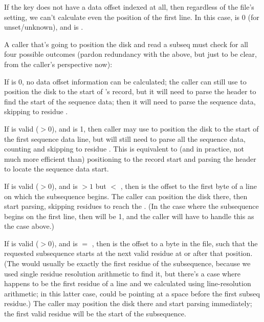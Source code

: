 \begin{sreapi}
If the key does not have a data offset indexed at all,
then regardless of the file's 
setting, we can't calculate even the position of the
first line. In this case,  is 0 (for
unset/unknown), and  is .

A caller that's going to position the disk and read a
subseq must check for all four possible outcomes (pardon
redundancy with the above, but just to be clear, from the
caller's perspective now):

If  is 0, no data offset information can be
calculated; the caller can still use  to
position the disk to the start of 's record, but it
will need to parse the header to find the start of the
sequence data; then it will need to parse the sequence
data, skipping to residue .

If  is valid ($>0$), and  is
1, then caller may use  to position the disk to
the start of the first sequence data line, but will still
need to parse all the sequence data, counting and
skipping to residue . This is equivalent
to (and in practice, not much more efficient than)
positioning to the record start and parsing the header to
locate the sequence data start. 

If  is valid ($>0$), and  is
$>1$ but $<$ , then  is the
offset to the first byte of a line on which the
subsequence begins. The caller can position the disk
there, then start parsing, skipping  residues to reach the
. (In the case where the subsequence
begins on the first line, then  will be
1, and the caller will have to handle this as the case
above.)

If  is valid ($>0$), and  is
$=$ , then  is the offset to a
byte in the file, such that the requested subsequence
starts at the next valid residue at or after that
position.  (The  would usually be exactly the
first residue of the subsequence, because we used single
residue resolution arithmetic to find it, but there's a
case where  happens to be the first
residue of a line and we calculated  using
line-resolution arithmetic; in this latter case,
 could be pointing at a space before the first
subseq residue.) The caller may position the disk there
and start parsing immediately; the first valid residue
will be the start of the subsequence.


\end{sreapi}
